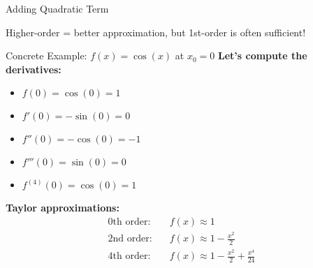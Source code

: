 \documentclass[usenames,dvipsnames]{beamer}
\begin{document}
  \begin{frame}{Adding Quadratic Term}
    \begin{center}
    \end{center}

    \begin{keypointsbox}{}
    Higher-order = better approximation, but 1st-order is often sufficient!
    \end{keypointsbox}
  \end{frame}

  \begin{frame}{Concrete Example: $f(x) = \cos(x)$ at $x_0 = 0$}
    \textbf{Let's compute the derivatives:}
    \begin{itemize}[<+->]
        \item $f(0) = \cos(0) = 1$
        \item $f'(0) = -\sin(0) = 0$
        \item $f''(0) = -\cos(0) = -1$
        \item $f'''(0) = \sin(0) = 0$
        \item $f^{(4)}(0) = \cos(0) = 1$
    \end{itemize}
    
    \pause
    \textbf{Taylor approximations:}
    \begin{align}
        \text{0th order:} \quad &f(x) \approx 1\\
        \text{2nd order:} \quad &f(x) \approx 1 - \frac{x^2}{2}\\
        \text{4th order:} \quad &f(x) \approx 1 - \frac{x^2}{2} + \frac{x^4}{24}
    \end{align}
  \end{frame}
\end{document}
